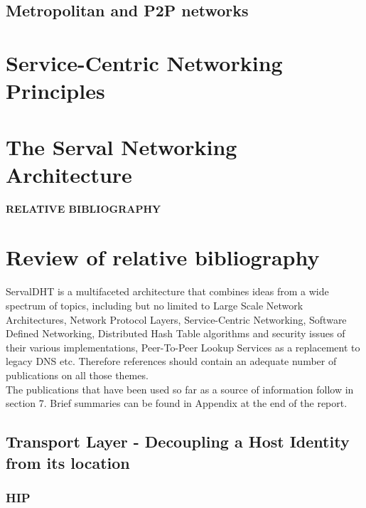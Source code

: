 \documentclass[12pt,a4paper,oneside]{article}
\begin{document}
\subsection{Metropolitan and P2P networks}

\newpage
\section{Service-Centric Networking Principles}

\newpage
\section{The Serval Networking Architecture}



\newpage
\thispagestyle{empty}
{}
{\Huge \bf \noindent RELATIVE BIBLIOGRAPHY}
\newpage

\section{Review of relative bibliography}
\label{sec:reviewbibliography}
ServalDHT is a multifaceted architecture that combines ideas from a wide spectrum of topics, including but no limited to Large Scale Network Architectures, Network Protocol Layers, Service-Centric Networking, Software Defined Networking, Distributed Hash Table algorithms and security issues of their various implementations, Peer-To-Peer Lookup Services as a replacement to legacy DNS etc.
Therefore references should contain an adequate number of publications on all those themes.\\
\indent The publications that have been used so far as a source of information follow in section 7.
Brief summaries can be found in Appendix at the end of the report.


\subsection{Transport Layer - Decoupling a Host Identity from its location}
\subsubsection{HIP}
\end{document}

